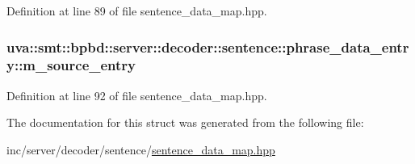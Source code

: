 Definition at line 89 of file sentence\+\_\+data\+\_\+map.\+hpp.

\hypertarget{structuva_1_1smt_1_1bpbd_1_1server_1_1decoder_1_1sentence_1_1phrase__data__entry_a4ae9bf3a78f729718c5b2d992060b092}{}
\subsubsection[{m\+\_\+source\+\_\+entry}]{ uva\+::smt\+::bpbd\+::server\+::decoder\+::sentence\+::phrase\+\_\+data\+\_\+entry\+::m\+\_\+source\+\_\+entry}\label{structuva_1_1smt_1_1bpbd_1_1server_1_1decoder_1_1sentence_1_1phrase__data__entry_a4ae9bf3a78f729718c5b2d992060b092}


Definition at line 92 of file sentence\+\_\+data\+\_\+map.\+hpp.



The documentation for this struct was generated from the following file\+:\begin{DoxyCompactItemize}
\item 
inc/server/decoder/sentence/\hyperlink{sentence__data__map_8hpp}{sentence\+\_\+data\+\_\+map.\+hpp}\end{DoxyCompactItemize}
